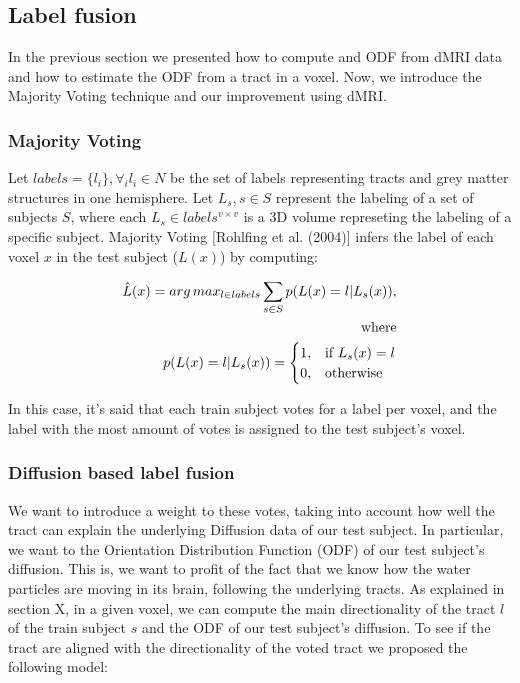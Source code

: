 \subsection{Label fusion}
In the previous section we presented how to compute and ODF from dMRI data and
how to estimate the ODF from a tract in a voxel. Now, we introduce the Majority
Voting technique and our improvement using dMRI.

\subsubsection{Majority Voting}
Let $labels = \{l_i\}, \forall_i l_i \in N$ be the set of labels representing
tracts and grey matter structures in one hemisphere. Let ${L_s}, s \in S$
represent the labeling of a set of subjects $S$, where each 
$L_s \in labels^{v\times v}$ is a 3D volume represeting the labeling of a
specific subject. Majority Voting [Rohlfing et al. (2004)] infers the label of
each voxel $x$ in the test subject ($L(x)$) by computing:

\begin{equation}
\label{eq:mvoting}
\begin{aligned}
    \hat L(x) = arg\,max_{l \in labels} \sum_{s\in S} p(L(x) = l | L_s(x)),\\
    \text{where} \\
    p(L(x) = l | L_s(x)) =
    \begin{cases}
        1,& \text{if } L_s(x) = l \\
        0,& \text{otherwise}
    \end{cases}
\end{aligned}
\end{equation}

In this case, it's said that each train subject votes for a label per voxel,
and the label with the most amount of votes is assigned to the test subject's
voxel.

\subsubsection{Diffusion based label fusion}
We want to introduce a weight to these votes, taking into account how well the
tract can explain the underlying Diffusion data of our test subject. In
particular, we want to the Orientation Distribution Function (ODF) of our
test subject's diffusion. This is, we want to profit of the fact that we know
how the water particles are moving in its brain, following the underlying tracts.
As explained in section X, in a given voxel, we can compute the main
directionality of the tract $l$ of the train subject $s$ and the ODF of our
test subject's diffusion. To see if the tract are aligned with the
directionality of the voted tract we proposed the following model:

